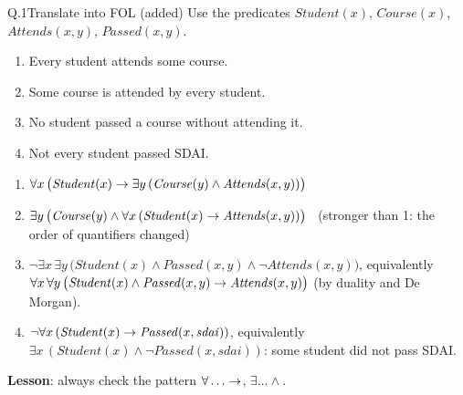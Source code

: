 \begin{nbexercise}{Q.1}{Translate into FOL (added)}
Use the predicates $\mathit{Student}(x)$, $\mathit{Course}(x)$, $\mathit{Attends}(x, y)$,
$\mathit{Passed}(x, y)$.
\begin{enumerate}[nosep]
  \item Every student attends some course.
  \item Some course is attended by every student.
  \item No student passed a course without attending it.
  \item Not every student passed SDAI.
\end{enumerate}
\end{nbexercise}
\begin{nbsolution}
\begin{enumerate}[nosep]
  \item $\forall x\,\big(\mathit{Student}(x) \rightarrow \exists y\,(\mathit{Course}(y) \land
        \mathit{Attends}(x, y))\big)$
  \item $\exists y\,\big(\mathit{Course}(y) \land \forall x\,(\mathit{Student}(x) \rightarrow
        \mathit{Attends}(x, y))\big)$ \ (stronger than 1: the order of quantifiers changed)
  \item $\neg \exists x\, \exists y\, \big(\mathit{Student}(x) \land \mathit{Passed}(x, y)
        \land \neg \mathit{Attends}(x, y)\big)$, equivalently
        $\forall x\, \forall y\, \big(\mathit{Student}(x) \land \mathit{Passed}(x, y)
        \rightarrow \mathit{Attends}(x, y)\big)$ (by duality and De Morgan).
  \item $\neg \forall x\,(\mathit{Student}(x) \rightarrow \mathit{Passed}(x, \mathit{sdai}))$,
        equivalently $\exists x\,(\mathit{Student}(x) \land \neg \mathit{Passed}(x,
        \mathit{sdai}))$: some student did not pass SDAI.
\end{enumerate}
\textbf{Lesson}: always check the pattern $\forall \ldots \rightarrow$, $\exists \ldots \land$.
\end{nbsolution}
